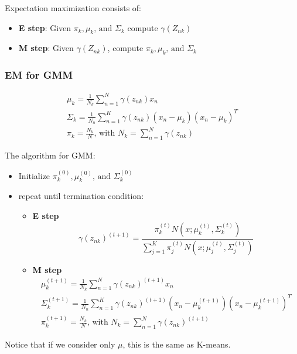 Expectation maximization consists of:
\begin{itemize}
    \item \textbf{E step}: Given $\pi_{k}, \mu_{k}\text{, and } \Sigma_{k}$ compute $\gamma(Z_{nk})$
    \item \textbf{M step}: Given $\gamma(Z_{nk})$, compute $\pi_{k}, \mu_{k}\text{, and } \Sigma_{k}$
\end{itemize}

\subsubsection{EM for GMM}
\begin{equation}
    \begin{multlined}
        \mu_{k} = \frac{1}{N_{k}}\sum_{n=1}^{N}\gamma(z_{nk})x_{n}\\
        \Sigma_{k} = \frac{1}{N_{n}}\sum_{n=1}^{K}\gamma(z_{nk})(x_{n}-\mu_{k})(x_{n}-\mu_{k})^{T}\\
        \pi_{k} = \frac{N_{k}}{N}\text{, with }N_{k}=\sum_{n=1}^{N}\gamma(z_{nk})
    \end{multlined}
\end{equation}

The algorithm for GMM:
\begin{itemize}
    \item Initialize $\pi_{k}^{(0)}, \mu_{k}^{(0)}\text{, and } \Sigma_{k}^{(0)}$
    \item repeat until termination condition:
    \begin{itemize}
        \item \textbf{E step}
        \begin{equation}
            \gamma(z_{nk})^{(t + 1)} = \frac{\pi_{k}^{(t)}N(x;\mu_{k}^{(t)}, \Sigma_{k}^{(t)})}{\sum_{j=1}^{K}\pi_{j}^{(t)}N(x;\mu_{j}^{(t)}, \Sigma_{j}^{(t)})}
        \end{equation}
        \item \textbf{M step}
        \begin{equation}
            \begin{multlined}
                \mu_{k}^{(t + 1)} = \frac{1}{N_{k}}\sum_{n=1}^{N}\gamma(z_{nk})^{(t + 1)}x_{n}\\
                \Sigma_{k}^{(t + 1)} = \frac{1}{N_{n}}\sum_{n=1}^{K}\gamma(z_{nk})^{(t + 1)}(x_{n}-\mu_{k}^{(t + 1)})(x_{n}-\mu_{k}^{(t + 1)})^{T}\\
                \pi_{k}^{(t + 1)} = \frac{N_{k}}{N}\text{, with }N_{k}=\sum_{n=1}^{N}\gamma(z_{nk})^{(t + 1)}
            \end{multlined}
        \end{equation}
    \end{itemize}
\end{itemize}
Notice that if we consider only $\mu$, this is the same as K-means.

